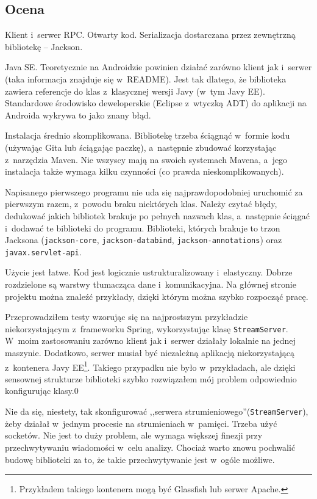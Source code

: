 \subsection{Ocena}

\begin{description}
Klient i~serwer RPC. Otwarty kod. Serializacja dostarczana przez zewnętrzną bibliotekę -- Jackson.

Java SE.
Teoretycznie na Androidzie powinien działać zarówno klient jak i~serwer (taka informacja znajduje się w~README).
Jest tak dlatego, że biblioteka zawiera referencje do klas z~klasycznej wersji Javy (w~tym Javy EE).
Standardowe środowisko deweloperskie (Eclipse z~wtyczką ADT) do aplikacji na Androida wykrywa to jako znany błąd.

Instalacja średnio skomplikowana.
Bibliotekę trzeba ściągnąć w~formie kodu (używając Gita lub ściągając paczkę), a~następnie zbudować korzystając z~narzędzia Maven.
Nie wszyscy mają na swoich systemach Mavena, a~jego instalacja także wymaga kilku czynności (co prawda nieskomplikowanych).

Napisanego pierwszego programu nie uda się najprawdopodobniej uruchomić za pierwszym razem, z~powodu braku niektórych klas.
Należy czytać błędy, dedukować jakich bibliotek brakuje po pełnych nazwach klas, a~następnie ściągać i~dodawać te biblioteki do programu.
Biblioteki, których brakuje to trzon Jacksona (\texttt{jackson-core}, \texttt{jackson-databind}, \texttt{jackson-annotations}) oraz \texttt{javax.servlet-api}.

Użycie jest łatwe. Kod jest logicznie ustrukturalizowany i~elastyczny.
Dobrze rozdzielone są warstwy tłumacząca dane i~komunikacyjna.
Na głównej stronie projektu można znaleźć przykłady, dzięki którym można szybko rozpocząć pracę.

Przeprowadziłem testy wzorując się na najprostszym przykładzie niekorzystającym z~frameworku Spring, wykorzystując klasę \texttt{StreamServer}.
W~moim zastosowaniu zarówno klient jak i~serwer działały lokalnie na jednej maszynie. Dodatkowo, serwer musiał być niezależną aplikacją niekorzystającą z~kontenera Javy EE\footnote{Przykładem takiego kontenera mogą być Glassfish lub serwer Apache.}.
Takiego przypadku nie było w~przykładach, ale dzięki sensownej strukturze biblioteki szybko rozwiązałem mój problem odpowiednio konfigurując klasy.0

Nie da się, niestety, tak skonfigurować ,,serwera strumieniowego''(\texttt{StreamServer}), żeby działał w~jednym procesie na strumieniach w~pamięci. Trzeba użyć socketów. Nie jest to duży problem, ale wymaga większej finezji przy przechwytywaniu wiadomości w~celu analizy. Chociaż warto znowu pochwalić budowę biblioteki za to, że takie przechwytywanie jest w~ogóle możliwe.


\end{description}
